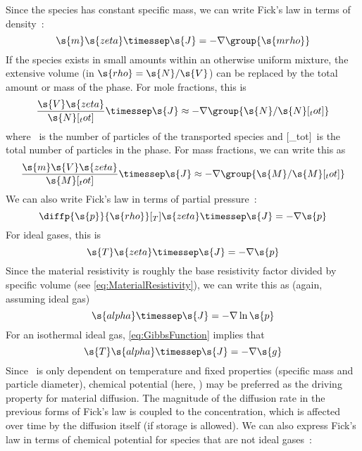 Since the species has constant specific mass, we can write Fick's law in terms of density~\cite{Burghardt2013, Bejan2006}:
\begin{equation}
  \s{m}\s{zeta}\timessep\s{J} = -\nabla\group{\s{mrho}}
\end{equation}
If the species exists in small amounts within an otherwise uniform mixture, the extensive volume (in $\s{rho} = \s{N}/\s{V}$) can be replaced by the total amount or mass of the phase.  For mole fractions, this is~\cite{Majumdar2005, Burghardt2013, Incropera2002, Taylor1993}
\begin{equation}
  \frac{\s{V}\s{zeta}}{\s{N}[_tot]}\timessep\s{J} \approx -\nabla\group{\s{N}/\s{N}[_tot]}
\end{equation}
where ~is the number of particles of the transported species and [_tot]~is the total number of particles in the phase.  For mass fractions, we can write this as~\cite{Majumdar2005, Burghardt2013, Incropera2002, Taylor1993}
\begin{equation}
  \frac{\s{m}\s{V}\s{zeta}}{\s{M}[_tot]}\timessep\s{J} \approx -\nabla\group{\s{M}/\s{M}[_tot]}
\end{equation}
We can also write Fick's law in terms of partial pressure~\cite{Burghardt2013}:
\begin{equation}
  \diffp{\s{p}}{\s{rho}}[_T]\s{zeta}\timessep\s{J} = -\nabla\s{p}
\end{equation}
For ideal gases, this is
\begin{equation}
  \s{T}\s{zeta}\timessep\s{J} = -\nabla\s{p}
\end{equation}
Since the material resistivity is roughly the base resistivity factor divided by specific volume (see \autoref{eq:MaterialResistivity}), we can write this as (again, assuming ideal gas)
\begin{equation}
  \s{alpha}\timessep\s{J} = -\nabla\ln\s{p}
\end{equation}
For an isothermal ideal gas, \autoref{eq:GibbsFunction} implies that
\begin{equation}
  \label{eq:FicksLawGibbsIdealGas}
  \s{T}\s{alpha}\timessep\s{J} = -\nabla\s{g}
\end{equation}
Since ~is only dependent on temperature and fixed properties (specific mass and particle diameter), chemical potential (here, ) may be preferred as the driving property for material diffusion.  The magnitude of the diffusion rate in the previous forms of Fick's law is coupled to the concentration, which is affected over time by the diffusion itself (if storage is allowed).  We can also express Fick's law in terms of chemical potential for species that are not ideal gases~\cite{Matuszak2006}:
